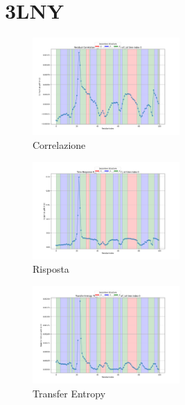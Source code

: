 \documentclass{article}
\begin{document}
\section{3LNY}
\begin{figure}[h]
    \centering
    \includegraphics[width=0.5\textwidth]{images/3LNYResidual Correlation C_ij for i=22 as a function of j at time index 0.png}
    \caption{Correlazione}
\end{figure}
\begin{figure}[h]
    \centering
    \includegraphics[width=0.5\textwidth]{images/3LNYTime Response R_ij for i=22 as a function of j at time index 0.png}
    \caption{Risposta}
\end{figure}

\begin{figure}[h]
    \centering
    \includegraphics[width=0.5\textwidth]{images/3LNYTransfer Entropy TE_ij for i=22 as a function of j at time index 0.png}
    \caption{Transfer Entropy}
\end{figure}
\end{document}
